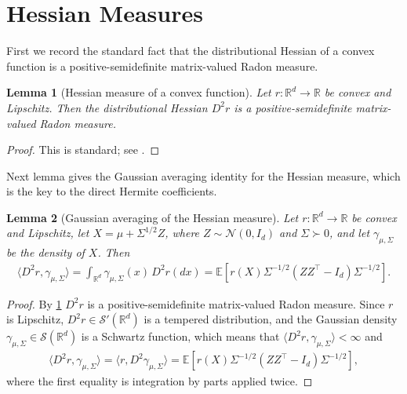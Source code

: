 \documentclass[11pt]{article}
\newtheorem{lemma}[lemma]{Lemma}
\newcommand{\R}{\mathbb R}
\newcommand{\E}{\mathbb E}
\newcommand{\N}{\mathcal N}
\newcommand{\1}{\mathbf 1}
\begin{document}
\section{Hessian Measures}
First we record the standard fact that the distributional Hessian of a convex function is a positive-semidefinite matrix-valued Radon measure.
\begin{lemma}[Hessian measure of a convex function]
    \label{lem:convex-hessian-measure}
    Let $r:\R^d\to\R$ be convex and Lipschitz.
    Then the distributional Hessian $D^2r$ is a positive-semidefinite
    matrix-valued Radon measure.
\end{lemma}
\begin{proof}
    This is standard; see \citet[Section~6.3]{evansgariepy2015measure}.
\end{proof}
Next lemma gives the Gaussian averaging identity for the Hessian measure, which is the key to the direct Hermite coefficients.
\begin{lemma}[Gaussian averaging of the Hessian measure]
    \label{lem:gaussian-hessian-average}
    Let $r:\R^d\to\R$ be convex and Lipschitz, let
    $X=\mu+\Sigma^{1/2}Z$, where $Z\sim\N(0,I_d)$ and $\Sigma\succ0$, and
    let $\gamma_{\mu,\Sigma}$ be the density of $X$.  Then
    \begin{align}
        \langle D^2r,\gamma_{\mu,\Sigma}\rangle
        =
        \int_{\R^d}
        \gamma_{\mu,\Sigma}(x)\,D^2r(dx)
        =
        \E\left[
            r(X)\Sigma^{-1/2}(ZZ^\top-I_d)\Sigma^{-1/2}
            \right].
        \label{eq:gaussian-hessian-average}
    \end{align}
\end{lemma}
\begin{proof}
    By \cref{lem:convex-hessian-measure}
    $D^2r$ is a positive-semidefinite matrix-valued Radon measure.
    Since $r$ is Lipschitz, $D^2r \in \mathcal S'(\R^d)$ is a tempered distribution,
    and the Gaussian density $\gamma_{\mu,\Sigma}\in\mathcal S(\R^d)$ is a Schwartz function,
    which means that $\langle D^2r,\gamma_{\mu,\Sigma}\rangle < \infty$ and
    \begin{align}
        \langle D^2r,\gamma_{\mu,\Sigma}\rangle
        =
        \langle r,D^2\gamma_{\mu,\Sigma}\rangle
        =
        \E\left[
            r(X)\Sigma^{-1/2}(ZZ^\top-I_d)\Sigma^{-1/2}
            \right],
    \end{align}
    where the first equality is integration by parts applied twice.
\end{proof}
\end{document}
